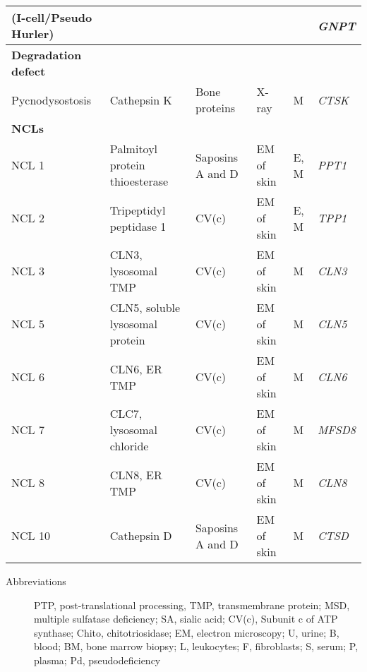 \documentclass[landscape]{article}
\begin{document}
\begin{longtable}{llllll}
(I-cell/Pseudo Hurler) &  &  &  &  & \emph{GNPT}\\
\hline
\textbf{Degradation defect} &  &  &  &  & \\
Pycnodysostosis & Cathepsin K & Bone proteins & X-ray & M & \emph{CTSK}\\
\hline
\textbf{NCLs} &  &  &  &  & \\
NCL 1 & Palmitoyl protein thioesterase & Saposins A and D & EM of skin & E, M & \emph{PPT1}\\
NCL 2 & Tripeptidyl peptidase 1 & CV(c) & EM of skin & E, M & \emph{TPP1}\\
NCL 3 & CLN3, lysosomal TMP & CV(c) & EM of skin & M & \emph{CLN3}\\
NCL 5 & CLN5, soluble lysosomal protein & CV(c) & EM of skin & M & \emph{CLN5}\\
NCL 6 & CLN6, ER TMP & CV(c) & EM of skin & M & \emph{CLN6}\\
NCL 7 & CLC7, lysosomal chloride & CV(c) & EM of skin & M & \emph{MFSD8}\\
NCL 8 & CLN8, ER TMP & CV(c) & EM of skin & M & \emph{CLN8}\\
NCL 10 & Cathepsin D & Saposins A and D & EM of skin & M & \emph{CTSD}\\
\end{longtable}
\begin{description}
\item[{Abbreviations}] PTP, post-translational processing, TMP,
transmembrane protein; MSD, multiple sulfatase deficiency; SA,
sialic acid; CV(c), Subunit c of ATP synthase; Chito,
chitotriosidase; EM, electron microscopy; U, urine; B, blood; BM,
bone marrow biopsy; L, leukocytes; F, fibroblasts; S, serum; P,
plasma; Pd, pseudodeficiency
\end{description}
\end{document}
